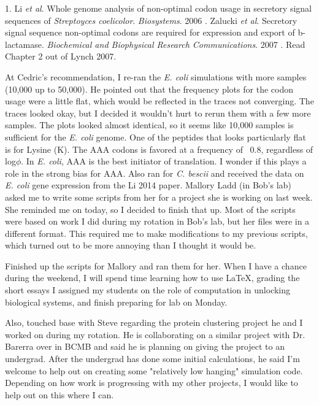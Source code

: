 \documentclass[11pt]{labbook}
\begin{document}
1. Li \textit{et al}.
Whole genome analysis of non-optimal codon usage in secretory signal sequences of \textit{Streptoyces coelicolor}. \textit{Biosystems}. 2006
. Zalucki \textit{et al}. Secretory signal sequence non-optimal codons are required for expression and export of b-lactamase. \textit{Biochemical and Biophysical Research Communications}. 2007
. Read Chapter 2 out of Lynch 2007.
\let\cleardoublepage\clearpage

At Cedric's recommendation, I re-ran the \textit{E. coli} simulations with more samples (10,000 up to 50,000). He pointed out that the frequency plots for the codon usage were a little flat, which would be reflected in the traces not converging. The traces looked okay, but I decided it wouldn't hurt to rerun them with a few more samples. The plots looked almost identical, so it seems like 10,000 samples is sufficient for the \textit{E. coli} genome. One of the peptides that looks particularly flat is for Lysine (K). The AAA codons is favored at a frequency of ~0.8, regardless of log$\phi$. In \textit{E. coli}, AAA is the best initiator of translation. I wonder if this plays a role in the strong bias for AAA.
\newline
Also ran for \textit{C. bescii} and received the data on \textit{E. coli} gene expression from the Li 2014 paper.
\newline
Mallory Ladd (in Bob's lab) asked me to write some scripts from her for a project she is working on last week. She reminded me on today, so I decided to finish that up. Most of the scripts were based on work I did during my rotation in Bob's lab, but her files were in a different format. This required me to make modifications to my previous scripts, which turned out to be more annoying than I thought it would be.

Finished up the scripts for Mallory and ran them for her. When I have a chance during the weekend, I will spend time learning how to use LaTeX, grading the short essays I assigned my students on the role of computation in unlocking biological systems, and finish preparing for lab on Monday.


Also, touched base with Steve regarding the protein clustering project he and I worked on during my rotation. He is collaborating on a similar project with Dr. Barerra over in BCMB and said he is planning on giving the project to an undergrad. After the undergrad has done some initial calculations, he said I'm welcome to help out on creating some "relatively low hanging" simulation code. Depending on how work is progressing with my other projects, I would like to help out on this where I can. 
\end{document}
